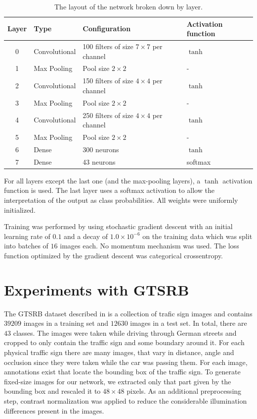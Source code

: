 \documentclass[11pt, a4paper]{article}
\begin{document}
\begin{table}[h!!!]
	\begin{tabular}{clll}
		Layer & Type & Configuration & Activation function \\
		\hline
		0 & Convolutional & 100 filters of size $7\times7$ per channel & $\tanh$ \\
		1 & Max Pooling & Pool size $2\times2$ & - \\
		2 & Convolutional & 150 filters of size $4\times4$ per channel & $\tanh$ \\
		3 & Max Pooling & Pool size $2\times2$ & - \\
		4 & Convolutional & 250 filters of size $4\times4$ per channel & $\tanh$ \\
		5 & Max Pooling & Pool size $2\times2$ & - \\
		6 & Dense & 300 neurons & $\tanh$ \\
		7 & Dense & 43 neurons & softmax
	\end{tabular}
	\caption{The layout of the network broken down by layer.}
	\label{tab:network-layout}
\end{table}

For all layers except the last one (and the max-pooling layers), a $\tanh$ activation function is used. The last layer uses a softmax activation to allow the interpretation of the output as class probabilities. All weights were uniformly initialized.

Training was performed by using stochastic gradient descent with an initial learning rate of $0.1$ and a decay of $1.0\times10^{-6}$ on the training data which was split into batches of $16$ images each. No momentum mechanism was used. The loss function optimized by the gradient descent was categorical crossentropy.

\section{Experiments with GTSRB}
The GTSRB dataset described in \cite{gtsrb} is a collection of trafic sign images and contains $39209$ images in a training set and $12630$ images in a test set. In total, there are $43$ classes. The images were taken while driving through German streets and cropped to only contain the traffic sign and some boundary around it. For each physical traffic sign there are many images, that vary in distance, angle and occlusion since they were taken while the car was passing them. For each image, annotations exist that locate the bounding box of the traffic sign. To generate fixed-size images for our network, we extracted only that part given by the bounding box and rescaled it to $48\times48$ pixels. As an additional preprocessing step, contrast normalization was applied to reduce the considerable illumination differences present in the images.
\end{document}
